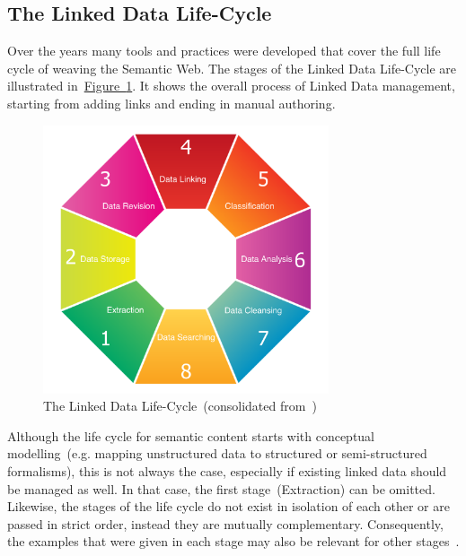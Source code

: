 \subsection{The Linked Data Life-Cycle}\label{sec:ld_lifecycle}
Over the years many tools and practices were developed that cover the full life cycle of weaving the Semantic Web. The stages of the Linked Data Life-Cycle are illustrated in~\hyperref[fig:linked_data_life_cycle]{Figure~\ref*{fig:linked_data_life_cycle}}. It shows the overall process of Linked Data management, starting from adding links and ending in manual authoring. 
\begin{figure}
	 \centering
	 \includegraphics[width=0.75\textwidth]{drawio/Linked_Data_Life_Cycle}
	 \caption{The Linked Data Life-Cycle~(consolidated from~\cite{auer2011, auer2012, siorpaes2008})}\label{fig:linked_data_life_cycle}
\end{figure}  
Although the life cycle for semantic content starts with conceptual modelling~(e.g. mapping unstructured data to structured or semi-structured formalisms), this is not always the case, especially if existing linked data should be managed as well. In that case, the first stage~(Extraction) can be omitted. Likewise, the stages of the life cycle do not exist in isolation of each other or are passed in strict order, instead they are mutually complementary. Consequently, the examples that were given in each stage may also be relevant for other stages~\cite{simperl2013}. 

